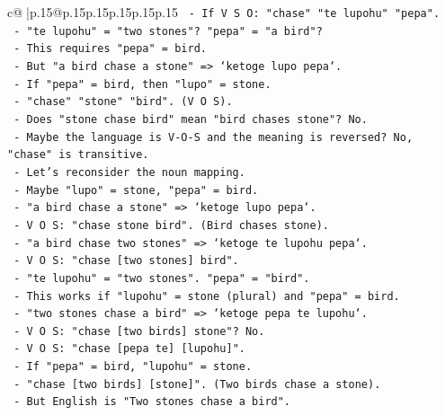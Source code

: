 \documentclass{article}
\begin{document}
{\begin{supertabular}{c@{$\;$}|p{.15\linewidth}@{}p{.15\linewidth}p{.15\linewidth}p{.15\linewidth}p{.15\linewidth}p{.15\linewidth}}
{{{\texttt{                   {-} If V S O: "chase" "te lupohu" "pepa".} \\
\texttt{                   {-} "te lupohu" = "two stones"? "pepa" = "a bird"?} \\
\texttt{                   {-} This requires "pepa" = bird.} \\
\texttt{                   {-} But "a bird chase a stone" => `ketoge lupo pepa`.} \\
\texttt{                   {-} If "pepa" = bird, then "lupo" = stone.} \\
\texttt{                   {-} "chase" "stone" "bird". (V O S).} \\
\texttt{                   {-} Does "stone chase bird" mean "bird chases stone"? No.} \\
\texttt{                   {-} Maybe the language is V{-}O{-}S and the meaning is reversed? No, "chase" is transitive.} \\
\texttt{                   {-} Let's reconsider the noun mapping.} \\
\texttt{                   {-} Maybe "lupo" = stone, "pepa" = bird.} \\
\texttt{                   {-} "a bird chase a stone" => `ketoge lupo pepa`.} \\
\texttt{                     {-} V O S: "chase stone bird". (Bird chases stone).} \\
\texttt{                   {-} "a bird chase two stones" => `ketoge te lupohu pepa`.} \\
\texttt{                     {-} V O S: "chase {[}two stones{]} bird".} \\
\texttt{                     {-} "te lupohu" = "two stones". "pepa" = "bird".} \\
\texttt{                     {-} This works if "lupohu" = stone (plural) and "pepa" = bird.} \\
\texttt{                   {-} "two stones chase a bird" => `ketoge pepa te lupohu`.} \\
\texttt{                     {-} V O S: "chase {[}two birds{]} stone"? No.} \\
\texttt{                     {-} V O S: "chase {[}pepa te{]} {[}lupohu{]}".} \\
\texttt{                     {-} If "pepa" = bird, "lupohu" = stone.} \\
\texttt{                     {-} "chase {[}two birds{]} {[}stone{]}". (Two birds chase a stone).} \\
\texttt{                     {-} But English is "Two stones chase a bird".} \\
}}}
\end{supertabular}}
\end{document}
